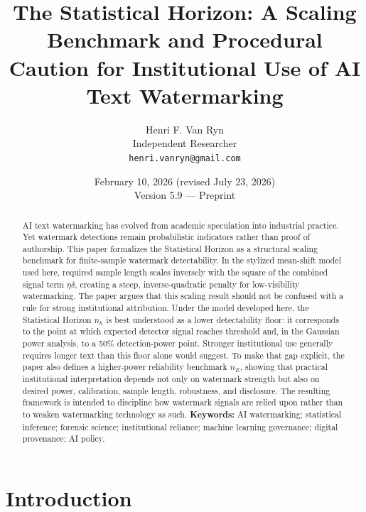 \documentclass[11pt]{article}
\title{The Statistical Horizon: A Scaling Benchmark and Procedural
Caution for Institutional Use of AI Text Watermarking}
\author{Henri F. Van Ryn\\
Independent Researcher\\
\texttt{henri.vanryn@gmail.com}}
\date{February 10, 2026 (revised July 23, 2026)\\Version 5.9 --- Preprint}
\begin{document}
\maketitle
\begin{abstract}
AI text watermarking has evolved from academic speculation into industrial
practice. Yet watermark detections remain probabilistic indicators rather than
proof of authorship. This paper formalizes the Statistical Horizon as a
structural scaling benchmark for finite-sample watermark detectability. In the
stylized mean-shift model used here, required sample length scales inversely with
the square of the combined signal term $\eta\delta$, creating a steep,
inverse-quadratic penalty for low-visibility watermarking.
The paper argues that this scaling result should not be confused with a rule for
strong institutional attribution. Under the model developed here, the Statistical
Horizon $n_h$ is best understood as a lower detectability floor: it corresponds to
the point at which expected detector signal reaches threshold and, in the Gaussian
power analysis, to a 50\% detection-power point. Stronger institutional use
generally requires longer text than this floor alone would suggest. To make that
gap explicit, the paper also defines a higher-power reliability benchmark $n_E$,
showing that practical institutional interpretation depends not only on watermark
strength but also on desired power, calibration, sample length, robustness, and
disclosure. The resulting framework is intended to discipline how watermark
signals are relied upon rather than to weaken watermarking technology as such.
\medskip
\noindent\textbf{Keywords:} AI watermarking; statistical inference; forensic
science; institutional reliance; machine learning governance; digital provenance;
AI policy.
\end{abstract}
\section{Introduction}
\end{document}
